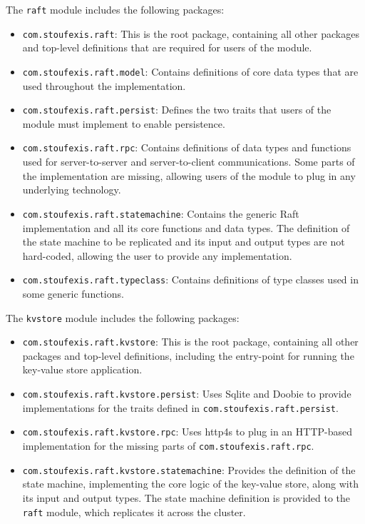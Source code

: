 The \lstinline|raft| module includes the following packages:
\begin{itemize}
    \item \lstinline|com.stoufexis.raft|: This is the root package, containing all other packages and top-level definitions that are required for users of the module.
    \item \lstinline|com.stoufexis.raft.model|: Contains definitions of core data types that are used throughout the implementation.
    \item \lstinline|com.stoufexis.raft.persist|: Defines the two traits that users of the module must implement to enable persistence.
    \item \lstinline|com.stoufexis.raft.rpc|: Contains definitions of data types and functions used for server-to-server and server-to-client communications. Some parts of the implementation are missing, allowing users of the module to plug in any underlying technology.
    \item \lstinline|com.stoufexis.raft.statemachine|: Contains the generic Raft implementation and all its core functions and data types. The definition of the state machine to be replicated and its input and output types are not hard-coded, allowing the user to provide any implementation.
    \item \lstinline|com.stoufexis.raft.typeclass|: Contains definitions of type classes \cite{wadler1989make} used in some generic functions.
\end{itemize}

The \lstinline|kvstore| module includes the following packages:
\begin{itemize}
    \item \lstinline|com.stoufexis.raft.kvstore|: This is the root package, containing all other packages and top-level definitions, including the entry-point for running the key-value store application.
    \item \lstinline|com.stoufexis.raft.kvstore.persist|: Uses Sqlite and Doobie to provide implementations for the traits defined in \lstinline|com.stoufexis.raft.persist|.
    \item \lstinline|com.stoufexis.raft.kvstore.rpc|: Uses http4s to plug in an HTTP-based implementation for the missing parts of \lstinline|com.stoufexis.raft.rpc|.
    \item \lstinline|com.stoufexis.raft.kvstore.statemachine|: Provides the definition of the state machine, implementing the core logic of the key-value store, along with its input and output types. The state machine definition is provided to the \lstinline|raft| module, which replicates it across the cluster.
\end{itemize}

